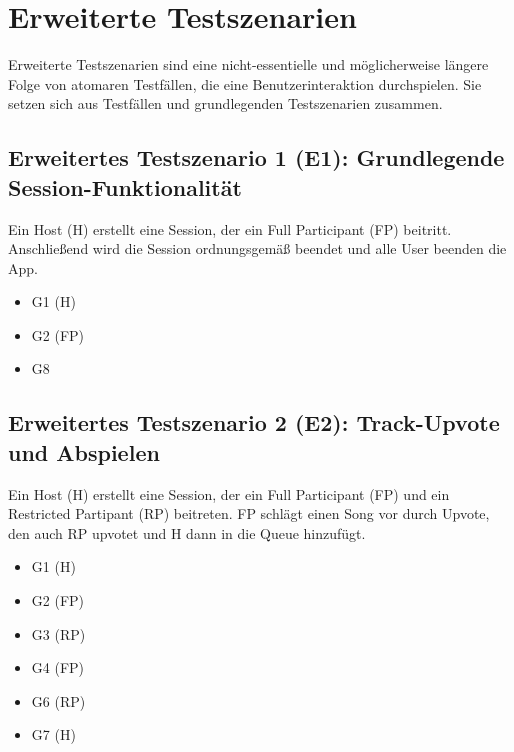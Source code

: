 \documentclass[oneside, ngerman]{sdqtechreport}
\begin{document}
\section{Erweiterte Testszenarien}
\label{sec:Tests:ErweiterteTestszenarien}

Erweiterte Testszenarien sind eine nicht-essentielle und möglicherweise längere Folge von atomaren Testfällen, die eine Benutzerinteraktion durchspielen. Sie setzen sich aus Testfällen und grundlegenden Testszenarien zusammen.


\subsection{Erweitertes Testszenario 1 (E1): Grundlegende Session-Funktionalität}
\label{subsec:Tests:ErweiterteTestszenarien:E1}
Ein Host (H) erstellt eine Session, der ein Full Participant (FP) beitritt. Anschließend wird die Session ordnungsgemäß beendet und alle User beenden die App.
\begin{itemize}
    \item G1 (H)
    \item G2 (FP)
    \item G8
\end{itemize}


\subsection{Erweitertes Testszenario 2 (E2): Track-Upvote und Abspielen}
\label{subsec:Tests:ErweiterteTestszenarien:E1}
Ein Host (H) erstellt eine Session, der ein Full Participant (FP) und ein Restricted Partipant (RP) beitreten. FP schlägt einen Song vor durch Upvote, den auch RP upvotet und H dann in die Queue hinzufügt.
\begin{itemize}
    \item G1 (H)
    \item G2 (FP)
    \item G3 (RP)
    \item G4 (FP)
    \item G6 (RP)
    \item G7 (H)
\end{itemize}
\end{document}
